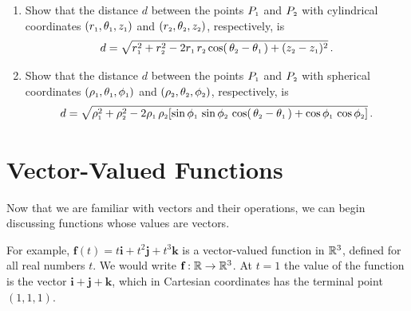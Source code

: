 \begin{enumerate}[\bfseries 1.]
\begin{displaymath}
    \cos ( \, \ssub{\theta}{2} - \ssub{\theta}{1} \, ) .
  \end{displaymath}
  This formula is used in electrodynamics to prove the addition theorem for spherical harmonics, which provides a
  general expression for the electrostatic potential at a point due to a unit charge. See pp. 100-102 in \cite{jac}.
 \item Show that the distance $d$ between the points $P_{\scriptscriptstyle 1}$ and $P_{\scriptscriptstyle 2}$ with cylindrical coordinates
  $( r_{\scriptscriptstyle 1},\theta_{\scriptscriptstyle 1},z_{\scriptscriptstyle 1} )$ and $( r_{\scriptscriptstyle 2},\theta_{\scriptscriptstyle 2},z_{\scriptscriptstyle 2} )$, respectively, is
  \begin{displaymath}
   d = \sqrt{r_{\scriptscriptstyle 1}^2 + r_{\scriptscriptstyle 2}^2 - 2 r_{\scriptscriptstyle 1}\,r_{\scriptscriptstyle 2} \cos (\, \theta_{\scriptscriptstyle 2} - \theta_{\scriptscriptstyle 1} \,)
   + ( z_{\scriptscriptstyle 2} - z_{\scriptscriptstyle 1} )^2} \, .
  \end{displaymath}
 \item Show that the distance $d$ between the points $P_{\scriptscriptstyle 1}$ and $P_{\scriptscriptstyle 2}$ with spherical coordinates
  $( \rho_{\scriptscriptstyle 1},\theta_{\scriptscriptstyle 1},\phi_{\scriptscriptstyle 1} )$ and $( \rho_{\scriptscriptstyle 2},\theta_{\scriptscriptstyle 2},\phi_{\scriptscriptstyle 2} )$,
  respectively, is
  \begin{displaymath}
   d = \sqrt{\rho_{\scriptscriptstyle 1}^2 + \rho_{\scriptscriptstyle 2}^2 - 2 \rho_{\scriptscriptstyle 1}\,\rho_{\scriptscriptstyle 2} [ \sin \phi_{\scriptscriptstyle 1} \,
    \sin \phi_{\scriptscriptstyle 2} \,\cos ( \, \theta_{\scriptscriptstyle 2} - \theta_{\scriptscriptstyle 1} \, ) +
    \cos \phi_{\scriptscriptstyle 1} \, \cos \phi_{\scriptscriptstyle 2} ]} \, .
  \end{displaymath}
\end{enumerate}
\newpage
\section{Vector-Valued Functions}
Now that we are familiar with vectors and their operations, we can begin discussing functions whose values are
vectors.


For example, $\textbf{f}(t) = t \textbf{i} + t^2 \textbf{j} + t^3 \textbf{k}$ is a vector-valued function in $\mathbb{R}^{3}$,
defined for all real numbers $t$. We would write $\textbf{f}: \mathbb{R} \rightarrow \mathbb{R}^{3}$. At $t = 1$
the value of the function is the vector $\textbf{i} + \textbf{j} + \textbf{k}$, which in Cartesian coordinates has the
terminal point $(1,1,1)$.

